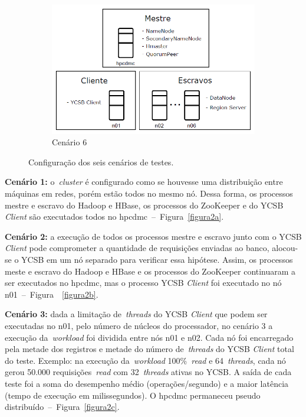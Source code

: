 \documentclass[12pt]{article}
\begin{document}
\begin{figure}
\begin{subfigure}{0.35\textwidth}
        \includegraphics[width=1.0\textwidth]{images/cenario-6.png}
        \caption{Cenário 6}%
        \label{figura2f}
    \end{subfigure}
    \caption{Configuração dos seis cenários de testes.}
\end{figure}

\textbf{Cenário 1:} o~\emph{cluster} é configurado como se houvesse uma distribuição entre máquinas em redes, porém estão todos no mesmo nó. 
Dessa forma, os processos mestre e escravo do Hadoop e HBase, os processos do ZooKeeper e do YCSB \emph{Client} são executados todos no hpcdmc~--~Figura~\ref{figura2a}.

\textbf{Cenário 2:} a execução de todos os processos mestre e escravo junto com o YCSB \emph{Client} pode comprometer a quantidade de requisições enviadas ao banco, alocou-se o YCSB em um nó separado para verificar essa hipótese. 
Assim, os processos meste e escravo do Hadoop e HBase e os processos do ZooKeeper continuaram a ser executados no hpcdmc, mas o processo YCSB \emph{Client} foi executado no nó n01~--~Figura~~\ref{figura2b}.

\textbf{Cenário 3:} dada a limitação de~\emph{threads} do YCSB \emph{Client} que podem ser executadas no n01, pelo número de núcleos do processador, no cenário 3 a execução da~\emph{workload} foi dividida entre nós n01 e n02. 
Cada nó foi encarregado pela metade dos registros e metade do número de~\emph{threads} do YCSB \emph{Client} total do teste. 
Exemplo: na execução da~\emph{workload} 100\%~\emph{read} e 64~\emph{threads}, cada nó gerou 50.000 requisições~\emph{read} com 32~\emph{threads} ativas no YCSB. 
A saída de cada teste foi a soma do desempenho médio (operações/segundo) e a maior latência (tempo de execução em milissegundos). 
O hpcdmc permaneceu pseudo distribuído~--~Figura~\ref{figura2c}.
\end{document}

